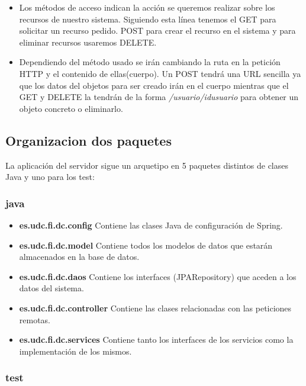 \begin{itemize}
\item Los métodos de acceso indican la acción se queremos realizar sobre los recursos de nuestro sistema. Siguiendo esta línea tenemos el GET para solicitar un recurso pedido. POST para crear el recurso en el sistema y  para eliminar recursos usaremos DELETE. 



\item Dependiendo del método usado se irán cambiando la ruta en la petición HTTP y el contenido de ellas(cuerpo). Un POST tendrá una URL sencilla ya que los datos del objetos para ser creado irán en el cuerpo mientras que el GET y DELETE la tendrán de la forma \textit{ /usuario/{idusuario}} para obtener un objeto concreto o eliminarlo.





 


\end{itemize}

\subsection{Organizacion dos paquetes}
La aplicación del servidor sigue un arquetipo en 5 paquetes distintos de clases Java y uno para los test:
\subsubsection{java}
\begin{itemize}
\item\textbf{ es.udc.fi.dc.config} Contiene las clases Java de configuración de Spring.
\item \textbf{es.udc.fi.dc.model} Contiene todos los modelos de datos que estarán almacenados en la base de datos.
\item \textbf{es.udc.fi.dc.daos} Contiene los interfaces (JPARepository) que aceden a los datos del sistema.
\item \textbf{es.udc.fi.dc.controller} Contiene las clases relacionadas  con las peticiones remotas.
\item  \textbf{es.udc.fi.dc.services} Contiene tanto los interfaces de los servicios como la implementación de los mismos.


\end{itemize}
\subsubsection{test}


